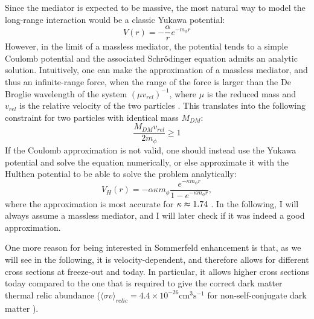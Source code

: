 Since the mediator is expected to be massive, the most natural way to model the long-range interaction would be a classic Yukawa potential:
\begin{equation}
	V(r) = -\frac{\alpha }{r} e^{-m_{\phi } r}
\end{equation}
However, in the limit of a massless mediator, the potential tends to a simple Coulomb potential and the associated Schrödinger equation admits an analytic solution. Intuitively, one can make the approximation of a massless mediator, and thus an infinite-range force, when the range of the force is larger than the De Broglie wavelength of the system \((\mu v_{rel})^{-1} \), where \(\mu \) is the reduced mass and \(v_{rel} \) is the relative velocity of the two particles \cite{Sala_2019}. This translates into the following constraint for two particles with identical mass \(M_{DM} \):
\begin{equation}
	\frac{M_{DM} v_{rel} }{2m_{\phi } }\geq 1
\end{equation}
If the Coulomb approximation is not valid, one should instead use the Yukawa potential and solve the equation numerically, or else approximate it with the Hulthen potential to be able to solve the problem analytically:
\begin{equation}\label{eq:Coulomb_approx}
	V_H(r) = -\alpha \kappa m_{\phi } \frac{e^{-\kappa m_{\phi }r }}{1- e^{-\kappa m_{\phi }r }},
\end{equation}
where the approximation is most accurate for \(\kappa \thickapprox 1.74\) \cite{Cirelli_2024}. In the following, I will always assume a massless mediator, and I will later check if it was indeed a good approximation.

One more reason for being interested in Sommerfeld enhancement is that, as we will see in the following, it is velocity-dependent, and therefore allows for different cross sections at freeze-out and today. In particular, it allows higher cross sections today compared to the one that is required to give the correct dark matter thermal relic abundance (\(\langle \sigma v \rangle_{relic}=4.4\times 10^{-26} \mathrm{cm^3 s^{-1}}\) for non-self-conjugate dark matter \cite{Hooper_2018}).